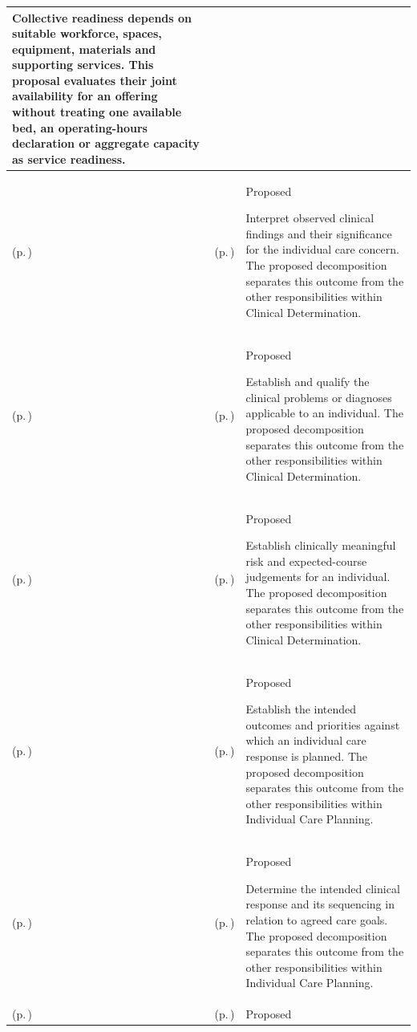 \begin{longtable}{|>{\raggedright\arraybackslash}p{0.27\TableWidth}|>{\raggedright\arraybackslash}p{0.27\TableWidth}|>{\raggedright\arraybackslash}p{0.46\TableWidth}|}
Collective readiness depends on suitable workforce, spaces, equipment, materials and supporting services. This proposal evaluates their joint availability for an offering without treating one available bed, an operating-hours declaration or aggregate capacity as service readiness.\\\hline
\nameref{cap:bc-clinical-determination} (p.\,\pageref{cap:bc-clinical-determination}) & \nameref{cap:bc-clinical-finding-interpretation} (p.\,\pageref{cap:bc-clinical-finding-interpretation}) & Proposed

Interpret observed clinical findings and their significance for the individual care concern. The proposed decomposition separates this outcome from the other responsibilities within Clinical Determination.\\\hline
\nameref{cap:bc-clinical-determination} (p.\,\pageref{cap:bc-clinical-determination}) & \nameref{cap:bc-diagnosis-problem-determination} (p.\,\pageref{cap:bc-diagnosis-problem-determination}) & Proposed

Establish and qualify the clinical problems or diagnoses applicable to an individual. The proposed decomposition separates this outcome from the other responsibilities within Clinical Determination.\\\hline
\nameref{cap:bc-clinical-determination} (p.\,\pageref{cap:bc-clinical-determination}) & \nameref{cap:bc-health-risk-prognostic-determination} (p.\,\pageref{cap:bc-health-risk-prognostic-determination}) & Proposed

Establish clinically meaningful risk and expected-course judgements for an individual. The proposed decomposition separates this outcome from the other responsibilities within Clinical Determination.\\\hline
\nameref{cap:bc-individual-care-planning} (p.\,\pageref{cap:bc-individual-care-planning}) & \nameref{cap:bc-care-goal-definition} (p.\,\pageref{cap:bc-care-goal-definition}) & Proposed

Establish the intended outcomes and priorities against which an individual care response is planned. The proposed decomposition separates this outcome from the other responsibilities within Individual Care Planning.\\\hline
\nameref{cap:bc-individual-care-planning} (p.\,\pageref{cap:bc-individual-care-planning}) & \nameref{cap:bc-care-response-planning} (p.\,\pageref{cap:bc-care-response-planning}) & Proposed

Determine the intended clinical response and its sequencing in relation to agreed care goals. The proposed decomposition separates this outcome from the other responsibilities within Individual Care Planning.\\\hline
\nameref{cap:bc-medication-pharmacy-services} (p.\,\pageref{cap:bc-medication-pharmacy-services}) & \nameref{cap:bc-medication-compounding-preparation} (p.\,\pageref{cap:bc-medication-compounding-preparation}) & Proposed


\end{longtable}
